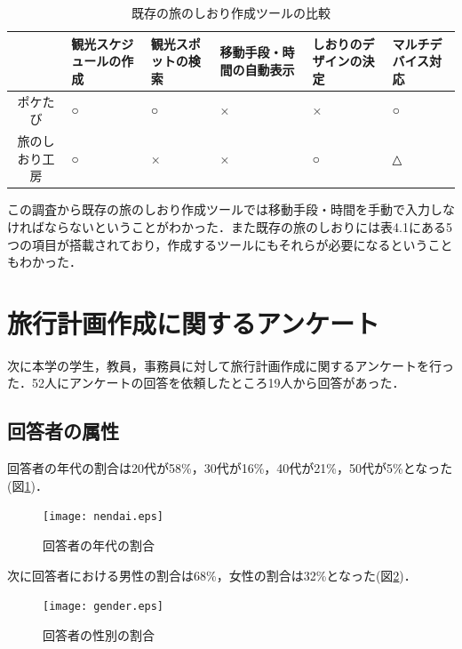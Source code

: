 \documentclass{funthesis}
\begin{document}
\begin{table}[htb]
\begin{center}
\caption{既存の旅のしおり作成ツールの比較}
  \begin{tabular}{|c|p{2.0cm}|p{2.0cm}|p{2.0cm}|p{2.0cm}|p{2.0cm}|} \hline
     & 観光スケジュールの作成 & 観光スポットの検索 & 移動手段・時間の自動表示 & しおりのデザインの決定 & マルチデバイス対応 \\ \hline 
    ポケたび & ○ & ○ & × & × & ○ \\ \hline
    旅のしおり工房 & ○ & × & × & ○ & △\\ \hline
  \end{tabular}
  \end{center}
\end{table}


この調査から既存の旅のしおり作成ツールでは移動手段・時間を手動で入力しなければならないということがわかった．また既存の旅のしおりには表4.1にある5つの項目が搭載されており，作成するツールにもそれらが必要になるということもわかった．\\



\section{旅行計画作成に関するアンケート}
次に本学の学生，教員，事務員に対して旅行計画作成に関するアンケートを行った．52人にアンケートの回答を依頼したところ19人から回答があった．\\

\subsection{回答者の属性}
回答者の年代の割合は20代が58\%，30代が16\%，40代が21\%，50代が5\%となった(図\ref{Lnendai})．

\begin{figure}[htpb]
\begin{center}
\texttt{[image: nendai.eps]}
\end{center}
\caption{回答者の年代の割合}
\label{Lnendai}
\end{figure}

\clearpage

次に回答者における男性の割合は68\%，女性の割合は32\%となった(図\ref{Lgender})．

\begin{figure}[htpb]
\begin{center}
\texttt{[image: gender.eps]}
\end{center}
\caption{回答者の性別の割合}
\label{Lgender}
\end{figure}
\end{document}
